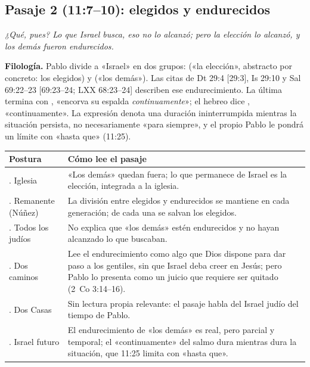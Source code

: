 \subsection{Pasaje 2 (11:7--10): elegidos y endurecidos}

\begin{cita}[fontupper=\upshape]
\par\smallskip
\itshape ¿Qué, pues? Lo que Israel busca, eso no lo alcanzó; pero la elección lo alcanzó, y los demás fueron endurecidos.
\end{cita}

\textbf{Filología.} Pablo divide a «Israel» en dos grupos:  («la elección», abstracto por concreto: los elegidos) y  («los demás»). Las citas de Dt 29:4 [29:3], Is 29:10 y Sal 69:22--23 [69:23--24; LXX 68:23--24] describen ese endurecimiento. La última termina con , «encorva su espalda \emph{continuamente}»; el hebreo dice , «continuamente». La expresión denota una duración ininterrumpida mientras la situación persista, no necesariamente «para siempre», y el propio Pablo le pondrá un límite con «hasta que» (11:25).

\begin{center}\footnotesize
\renewcommand{\arraystretch}{1.25}
\begin{tabular}{>{\RaggedRight\arraybackslash}p{2.9cm}>{\RaggedRight\arraybackslash}p{11.1cm}}
\toprule
\textbf{Postura} & \textbf{Cómo lee el pasaje}\\
\midrule
1. Iglesia & «Los demás» quedan fuera; lo que permanece de Israel es la elección, integrada a la iglesia.\\
2. Remanente (Núñez) & La división entre elegidos y endurecidos se mantiene en cada generación; de cada una se salvan los elegidos.\\
3. Todos los judíos & No explica que «los demás» estén endurecidos y no hayan alcanzado lo que buscaban.\\
4. Dos caminos & Lee el endurecimiento como algo que Dios dispone para dar paso a los gentiles, sin que Israel deba creer en Jesús; pero Pablo lo presenta como un juicio que requiere ser quitado (2~Co 3:14--16).\\
5. Dos Casas & Sin lectura propia relevante: el pasaje habla del Israel judío del tiempo de Pablo.\\
6. Israel futuro & El endurecimiento de «los demás» es real, pero parcial y temporal; el «continuamente» del salmo dura mientras dura la situación, que 11:25 limita con «hasta que».\\
\bottomrule
\end{tabular}\end{center}

